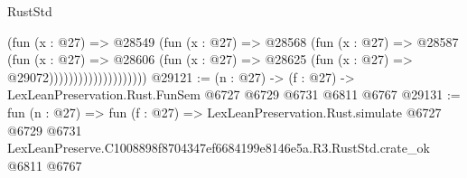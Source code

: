 \begin{lexlean}{RustStd}
\begin{coremodule}
                                (fun (x : @27) =>
                                @28549
                                  (fun (x : @27) =>
                                  @28568
                                    (fun (x : @27) =>
                                    @28587
                                      (fun (x : @27) =>
                                      @28606
                                        (fun (x : @27) =>
                                        @28625 (fun (x : @27) => @29072))))))))))))))))))))
@29121 := (n : @27) -> (f : @27) -> LexLeanPreservation.Rust.FunSem @6727 @6729 @6731 @6811 @6767
@29131 := fun (n : @27) =>
  fun (f : @27) =>
  LexLeanPreservation.Rust.simulate
    @6727
    @6729
    @6731
    LexLeanPreserve.C1008898f8704347ef6684199e8146e5a.R3.RustStd.crate_ok
    @6811
    @6767
\end{coremodule}
\end{lexlean}
